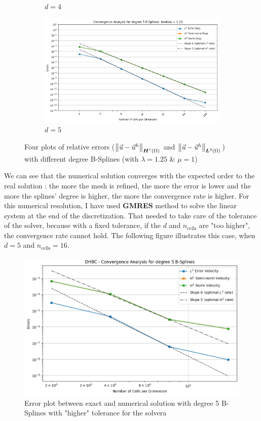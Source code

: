 \documentclass[a4paper,12pt,twoside]{report}
\begin{document}
\begin{figure}[!h]
\begin{subfigure}[b]{0.49\textwidth}
		\caption{$d=4$}
		\label{fig:deg4_NMDHBC}
	\end{subfigure}
	\begin{subfigure}[b]{0.49\textwidth}
		\centering
		\includegraphics[width=\textwidth]{figures_non_mixed_DH/convergence_plot_degree_5_lambda=1.25.png}
		\caption{$d=5$}
		\label{fig:deg5_NMDHBC}
	\end{subfigure}
	\caption{Four plots of relative errors ($\norm{\vec u - \vec u^h}_{\boldsymbol H^1(\Omega)}$ and $\norm{\vec u - \vec u^h}_{\boldsymbol L^2(\Omega)}$) with different degree B-Splines (with $\lambda = 1.25$  \& $\mu = 1$)}
	\label{fig:four_errors_graphs}
\end{figure}

We can see that the numerical solution converges with the expected order to the real solution : the more the mesh is refined, the more the error is lower and the more the splines' degree is higher, the more the convergence rate is higher. 
For this numerical resolution, I have used \textbf{GMRES} method to solve the linear system at the end of the discretization. That needed to take care of the tolerance of the solver, because with a fixed tolerance, if the $d$ and $n_{\text{cells}}$ are "too higher", the convergence rate cannot hold. The following figure illustrates this case, when $d=5$ and $n_{\text{cells}} = 16$.

\begin{figure}[!h]
	\centering
	\includegraphics[width=0.5\linewidth]{degre5_nul}
	\caption{Error plot between exact and numerical solution with degree 5 B-Splines with "higher" tolerance for the solvera}
\end{figure}
\end{document}
